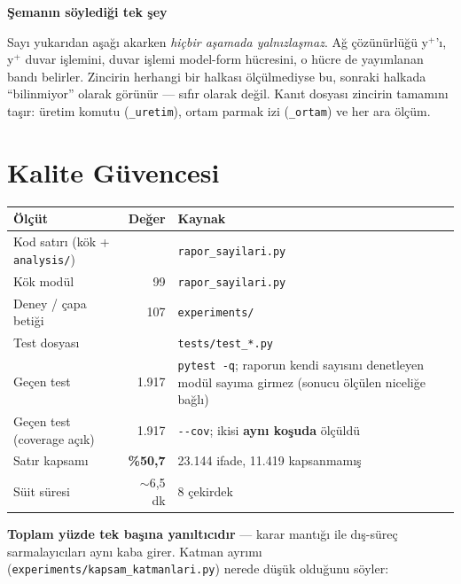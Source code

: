\documentclass[11pt,a4paper]{article}
\newcommand{\kkkenar}{lacivert}
\newcommand{\kkzemin}{kod}
\newenvironment{renkkutu}[3]{%
  \renewcommand{\kkkenar}{#1}\renewcommand{\kkzemin}{#2}%
  \par\medskip\noindent
  \begin{lrbox}{\kutugovde}%
  \begin{minipage}{\dimexpr\linewidth-2\fboxsep-2\fboxrule\relax}\footnotesize
  \textcolor{#1}{\textbf{#3}}\par\vspace{3pt}%
}{%
  \end{minipage}%
  \end{lrbox}%
  \noindent\fcolorbox{\kkkenar}{\kkzemin}{\usebox{\kutugovde}}%
  \par\medskip
}
\newenvironment{anafikir}[1]{\begin{renkkutu}{lacivert}{kod}{#1}}{\end{renkkutu}}
\begin{document}
\begin{anafikir}{Şemanın söylediği tek şey}
Sayı yukarıdan aşağı akarken \emph{hiçbir aşamada yalnızlaşmaz}. Ağ
çözünürlüğü y$^+$'ı, y$^+$ duvar işlemini, duvar işlemi model-form hücresini,
o hücre de yayımlanan bandı belirler. Zincirin herhangi bir halkası
ölçülmediyse bu, sonraki halkada ``bilinmiyor'' olarak görünür --- sıfır
olarak değil. Kanıt dosyası zincirin tamamını taşır: üretim komutu
(\texttt{\_uretim}), ortam parmak izi (\texttt{\_ortam}) ve her ara ölçüm.
\end{anafikir}

\section{Kalite Güvencesi}

\begin{center}\footnotesize
\begin{tabular}{@{}lrl@{}}
\toprule
\textbf{Ölçüt} & \textbf{Değer} & \textbf{Kaynak} \\
\midrule
Kod satırı (kök + \texttt{analysis/}) & \raporSatirKod{} & \texttt{rapor\_sayilari.py} \\
Kök modül & 99 & \texttt{rapor\_sayilari.py} \\
Deney / çapa betiği & 107 & \texttt{experiments/} \\
Test dosyası & \raporTestDosya{} & \texttt{tests/test\_*.py} \\
Geçen test & 1.917 & \texttt{pytest -q}; raporun kendi sayısını denetleyen
  modül sayıma girmez (sonucu ölçülen niceliğe bağlı) \\
Geçen test (coverage açık) & 1.917 & \texttt{-{}-cov}; ikisi \textbf{aynı koşuda} ölçüldü \\
Satır kapsamı & \textbf{\%50{,}7} & 23.144 ifade, 11.419 kapsanmamış \\
Süit süresi & $\sim$6,5 dk & 8 çekirdek \\
\bottomrule
\end{tabular}
\end{center}

\noindent\textbf{Toplam yüzde tek başına yanıltıcıdır} --- karar mantığı ile
dış-süreç sarmalayıcıları aynı kaba girer. Katman ayrımı
(\texttt{experiments/kapsam\_katmanlari.py}) nerede düşük olduğunu söyler:
\end{document}
